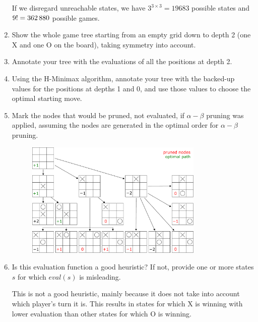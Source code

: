 \documentclass[11pt, a4paper]{article}
\begin{document}
\begin{enumerate}
    \begin{solution}
        If we disregard unreachable states, we have $3^{3 \times 3} = \num{19683}$ possible states and $9! = \num{362880}$ possible games.
    \end{solution}

    \item Show the whole game tree starting from an empty grid down to depth 2 (one X and one O on the board), taking symmetry into account.
    \item Annotate your tree with the evaluations of all the positions at depth 2.
    \item Using the H-Minimax algorithm, annotate your tree with the backed-up values for the positions at depths 1 and 0, and use those values to choose the optimal starting move.
    \item Mark the nodes that would be pruned, \ie{} not evaluated, if $\alpha - \beta$ pruning was applied, assuming the nodes are generated in the optimal order for $\alpha - \beta$ pruning.

    \begin{solution}
        \begin{figure}[H]
            \centering
            \includegraphics[width=0.8\textwidth]{figures/e2_tictactoe.pdf}
        \end{figure}
    \end{solution}

    \item Is this evaluation function a good heuristic? If not, provide one or more states $s$ for which $eval(s)$ is misleading.

    \begin{solution}
        This is not a good heuristic, mainly because it does not take into account which player's turn it is. This results in states for which X is winning with lower evaluation than other states for which O is winning.


\end{solution}
\end{enumerate}
\end{document}
